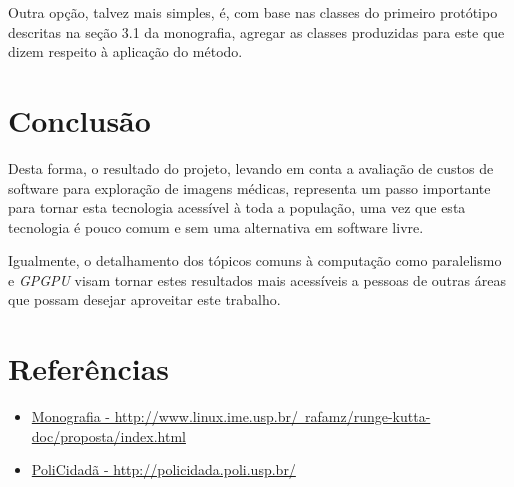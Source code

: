 \documentclass[a4paper,11pt]{report}
\begin{document}
  Outra opção, talvez mais simples, é, com base nas classes do primeiro protótipo descritas na seção 3.1 da monografia, agregar as classes produzidas para este que dizem respeito à aplicação do método.

\chapter{Conclusão}
Desta forma, o resultado do projeto, levando em conta a avaliação de custos de software para exploração de imagens médicas, representa um passo importante para tornar esta tecnologia acessível à toda a população, uma vez que esta tecnologia é pouco comum e sem uma alternativa em software livre.

Igualmente, o detalhamento dos tópicos comuns à computação como paralelismo e \textit{GPGPU} visam tornar estes resultados mais acessíveis a pessoas de outras áreas que possam desejar aproveitar este trabalho.

\chapter{Referências}
\begin{itemize}
  \item\label{monografia} \href{http://www.linux.ime.usp.br/~rafamz/runge-kutta-doc/proposta/index.html}{Monografia - http://www.linux.ime.usp.br/~rafamz/runge-kutta-doc/proposta/index.html}
  \item\label{policidada} \href{http://policidada.poli.usp.br/}{PoliCidadã - http://policidada.poli.usp.br/}
\end{itemize}
\end{document}
